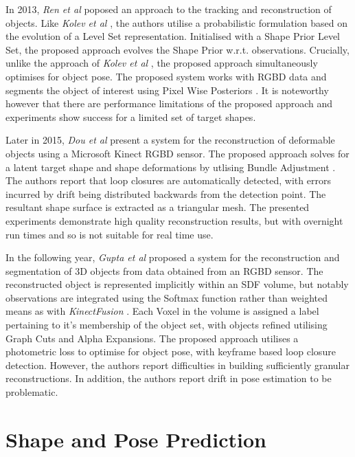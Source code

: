 In 2013, \textit{Ren et al} \cite{Ren2013} poposed an approach to the tracking and reconstruction of 
objects. Like \textit{Kolev et al} \cite{Kolev2006}, the authors utilise a probabilistic formulation 
based on the evolution of a Level Set representation. Initialised with a Shape Prior Level Set, the 
proposed approach evolves the Shape Prior w.r.t. observations. Crucially, unlike the approach of 
\textit{Kolev et al} \cite{Kolev2006}, the proposed approach simultaneously optimises for object pose.
The proposed system works with RGBD data and segments the object of interest using Pixel Wise Posteriors 
\cite{Bibby2008}. It is noteworthy however that there are performance limitations of the proposed approach 
and experiments show success for a limited set of target shapes.

Later in 2015, \textit{Dou et al} \cite{Dou2015} present a system for the reconstruction of deformable 
objects using a Microsoft Kinect RGBD sensor. The proposed approach solves for a latent target shape 
and shape deformations by utlising Bundle Adjustment \cite{BA}. The authors report that loop closures 
are automatically detected, with errors incurred by drift being distributed backwards from the detection 
point. The resultant shape surface is extracted as a triangular mesh. The presented experiments demonstrate 
high quality reconstruction results, but with overnight run times and so is not suitable for real time use.

In the following year, \textit{Gupta et al} \cite{Gupta2016} proposed a system for the reconstruction and 
segmentation of 3D objects from data obtained from an RGBD sensor. The reconstructed object is represented 
implicitly within an SDF volume, but notably observations are integrated using the Softmax function rather 
than weighted means as with \textit{KinectFusion} \cite{Newcombe2011}. Each Voxel in the volume is 
assigned a label pertaining to it's membership of the object set, with objects refined utilising Graph 
Cuts and Alpha Expansions. The proposed approach utilises a photometric loss to optimise for object pose, 
with keyframe based loop closure detection. However, the authors report difficulties in building 
sufficiently granular reconstructions. In addition, the authors report drift in pose estimation to be 
problematic.

\section{Shape and Pose Prediction}
\label{sec:lit_review_prediction}

